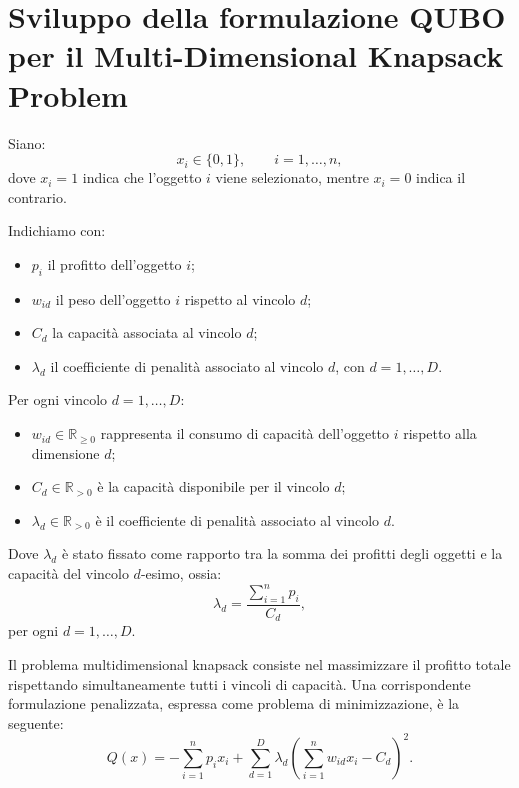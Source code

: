 \documentclass[a4paper,12pt]{article}
\begin{document}
\section*{Sviluppo della formulazione QUBO per il Multi-Dimensional Knapsack Problem}

Siano:
\[
x_i \in \{0,1\}, \qquad i=1,\dots,n,
\]
dove \(x_i = 1\) indica che l'oggetto \(i\) viene selezionato, mentre \(x_i = 0\) indica il contrario.

Indichiamo con:
\begin{itemize}
    \item \(p_i\) il profitto dell'oggetto \(i\);
    \item \(w_{id}\) il peso dell'oggetto \(i\) rispetto al vincolo \(d\);
    \item \(C_d\) la capacità associata al vincolo \(d\);
    \item \(\lambda_d\) il coefficiente di penalità associato al vincolo \(d\), con \(d=1,\dots,D\).
\end{itemize}

Per ogni vincolo \(d = 1, \dots, D\):

\begin{itemize}
    \item \(w_{id} \in \mathbb{R}_{\ge 0}\) rappresenta il consumo di capacità dell'oggetto \(i\) rispetto alla dimensione \(d\);
    \item \(C_d \in \mathbb{R}_{>0}\) è la capacità disponibile per il vincolo \(d\);
    \item \(\lambda_d \in \mathbb{R}_{>0}\) è il coefficiente di penalità associato al vincolo \(d\).
\end{itemize}

Dove \(\lambda_d\) è stato fissato come rapporto tra la somma dei profitti degli oggetti e la capacità del vincolo \(d\)-esimo, ossia:
\begin{equation}
\lambda_d = \frac{\sum_{i=1}^{n} p_i}{C_d},
\tag{*}
\end{equation}
per ogni \(d = 1, \dots, D\).

Il problema multidimensional knapsack consiste nel massimizzare il profitto totale rispettando simultaneamente tutti i vincoli di capacità.  
Una corrispondente formulazione penalizzata, espressa come problema di minimizzazione, è la seguente:
\begin{equation}
Q(x)= -\sum_{i=1}^{n} p_i x_i + \sum_{d=1}^{D} \lambda_d \left(\sum_{i=1}^{n} w_{id}x_i - C_d\right)^2.
\end{equation}
\end{document}

